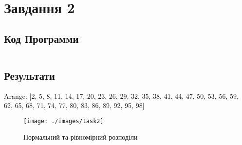 \section{Завдання 2}
\label{sec:task2}

\subsection{Код Программи}
\label{subsec:task2_code}
\inputminted{python}{../src/task2.py}

\subsection{Результати}
\label{subsec:task2_results}

Arange:
[2, 5, 8, 11, 14, 17, 20, 23, 26, 29, 32, 35, 38, 41, 44, 47, 50, 53,
56, 59, 62, 65, 68, 71, 74, 77, 80, 83, 86, 89, 92, 95, 98]

\begin{figure}[!ht]
    \centering
    \texttt{[image: ./images/task2]}
    \caption{Нормальний та рівномірний розподіли}
    \label{fig:normal_and_uniform_distribution}
\end{figure}
